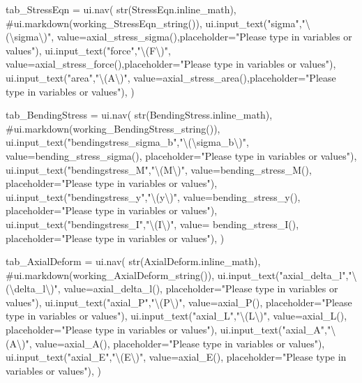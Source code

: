\documentclass[
  letterpaper,
  DIV=11,
  numbers=noendperiod]{scrreprt}
\newenvironment{Shaded}{\begin{snugshade}}{\end{snugshade}}
\newcommand{\NormalTok}[1]{\textcolor[rgb]{0.00,0.23,0.31}{#1}}
\begin{document}
\begin{Shaded}
\begin{Highlighting}[]
\NormalTok{        tab\_StressEqn = ui.nav(}
\NormalTok{                str(StressEqn.inline\_math),}
\NormalTok{                \#ui.markdown(working\_StressEqn\_string()),}
\NormalTok{                ui.input\_text("sigma","\textbackslash{}(\textbackslash{}sigma\textbackslash{})", value=axial\_stress\_sigma(),placeholder="Please type in variables or values"),}
\NormalTok{                ui.input\_text("force","\textbackslash{}(F\textbackslash{})", value=axial\_stress\_force(),placeholder="Please type in variables or values"),}
\NormalTok{                ui.input\_text("area","\textbackslash{}(A\textbackslash{})", value=axial\_stress\_area(),placeholder="Please type in variables or values"),}
\NormalTok{                )}
        
\NormalTok{        tab\_BendingStress = ui.nav(}
\NormalTok{                str(BendingStress.inline\_math),}
\NormalTok{                \#ui.markdown(working\_BendingStress\_string()),}
\NormalTok{                ui.input\_text("bendingstress\_sigma\_b","\textbackslash{}(\textbackslash{}sigma\_b\textbackslash{})", value=bending\_stress\_sigma(), placeholder="Please type in variables or values"),}
\NormalTok{                ui.input\_text("bendingstress\_M","\textbackslash{}(M\textbackslash{})", value=bending\_stress\_M(), placeholder="Please type in variables or values"),}
\NormalTok{                ui.input\_text("bendingstress\_y","\textbackslash{}(y\textbackslash{})", value=bending\_stress\_y(), placeholder="Please type in variables or values"),}
\NormalTok{                ui.input\_text("bendingstress\_I","\textbackslash{}(I\textbackslash{})", value= bending\_stress\_I(), placeholder="Please type in variables or values"),}
\NormalTok{                )}
        
\NormalTok{        tab\_AxialDeform = ui.nav(}
\NormalTok{                str(AxialDeform.inline\_math),}
\NormalTok{                \#ui.markdown(working\_AxialDeform\_string()),}
\NormalTok{                ui.input\_text("axial\_delta\_l","\textbackslash{}(\textbackslash{}delta\_l\textbackslash{})", value=axial\_delta\_l(), placeholder="Please type in variables or values"),}
\NormalTok{                ui.input\_text("axial\_P","\textbackslash{}(P\textbackslash{})", value=axial\_P(), placeholder="Please type in variables or values"),}
\NormalTok{                ui.input\_text("axial\_L","\textbackslash{}(L\textbackslash{})", value=axial\_L(), placeholder="Please type in variables or values"),}
\NormalTok{                ui.input\_text("axial\_A","\textbackslash{}(A\textbackslash{})", value=axial\_A(), placeholder="Please type in variables or values"),}
\NormalTok{                ui.input\_text("axial\_E","\textbackslash{}(E\textbackslash{})", value=axial\_E(), placeholder="Please type in variables or values"),}
\NormalTok{                )}
        

\end{Highlighting}
\end{Shaded}
\end{document}
